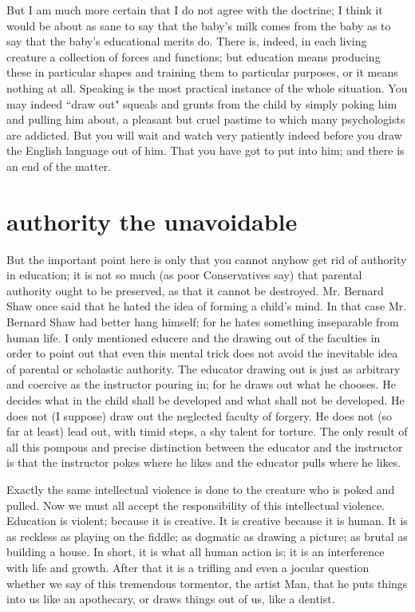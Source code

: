 \documentclass[final,10pt,letterpaper,twocolumn,openany]{book}
\begin{document}
But I am much more certain that I do not agree with
the doctrine; I think it would be about as sane to say that the baby's milk
comes from the baby as to say that the baby's educational merits do. There
is, indeed, in each living creature a collection of forces and functions; but
education means producing these in particular shapes and training them to
particular purposes, or it means nothing at all. Speaking is the most
practical instance of the whole situation. You may indeed ``draw out"
squeals and grunts from the child by simply poking him and pulling him
about, a pleasant but cruel pastime to which many psychologists are
addicted. But you will wait and watch very patiently indeed before you
draw the English language out of him. That you have got to put into him;
and there is an end of the matter.

\section{authority the unavoidable}

    But the important point here is only that you cannot anyhow get rid of
authority in education; it is not so much (as poor Conservatives say) that
parental authority ought to be preserved, as that it cannot be destroyed. Mr.
Bernard Shaw once said that he hated the idea of forming a child's mind.
In that case Mr. Bernard Shaw had better hang himself; for he hates
something inseparable from human life. I only mentioned educere and the
drawing out of the faculties in order to point out that even this mental trick
does not avoid the inevitable idea of parental or scholastic authority. The
educator drawing out is just as arbitrary and coercive as the instructor
pouring in; for he draws out what he chooses. He decides what in the child
shall be developed and what shall not be developed. He does not (I
suppose) draw out the neglected faculty of forgery. He does not (so far at
least) lead out, with timid steps, a shy talent for torture. The only result of
all this pompous and precise distinction between the educator and the
instructor is that the instructor pokes where he likes and the educator pulls
where he likes. 

Exactly the same intellectual violence is done to the
creature who is poked and pulled. Now we must all accept the
responsibility of this intellectual violence. Education is violent; because it
is creative. It is creative because it is human. It is as reckless as playing on
the fiddle; as dogmatic as drawing a picture; as brutal as building a house.
In short, it is what all human action is; it is an interference with life and
growth. After that it is a trifling and even a jocular question whether we
say of this tremendous tormentor, the artist Man, that he puts things into us
like an apothecary, or draws things out of us, like a dentist.
\end{document}
